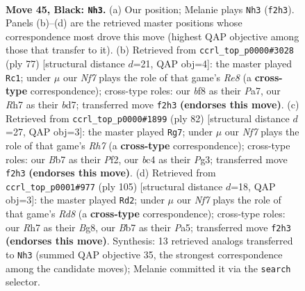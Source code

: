 \documentclass[11pt]{article}
\begin{document}
\clearpage

\begin{figure}[p]\centering
\begin{subfigure}{0.46\textwidth}\centering
\resizebox{\linewidth}{!}{%
\newchessgame
\chessboard[
  setfen={5BR1/pb1p3r/8/5k2/2B5/8/PPK2n2/8 b - - 11 45},
  showmover=false,
  pgfstyle=straightmove, color=movearrow, markmove={f2-h3}
]}
\caption{}
\end{subfigure}\hfill
\begin{subfigure}{0.46\textwidth}\centering
\resizebox{\linewidth}{!}{%
\newchessgame
\chessboard[
  setfen={6k1/p2B1p2/2PB4/3n4/P7/5P2/6K1/4r3 b - - 0 39},
  showmover=false,
  pgfstyle=straightmove, color=movearrow, markmove={e1-c1}
]}
\caption{}
\end{subfigure}
\\[4pt]
\begin{subfigure}{0.46\textwidth}\centering
\resizebox{\linewidth}{!}{%
\newchessgame
\chessboard[
  setfen={8/7R/2k3p1/r1b5/3p4/1K4P1/5P1P/5B2 w - - 1 42},
  showmover=false,
  pgfstyle=straightmove, color=movearrow, markmove={h7-g7}
]}
\caption{}
\end{subfigure}\hfill
\begin{subfigure}{0.46\textwidth}\centering
\resizebox{\linewidth}{!}{%
\newchessgame
\chessboard[
  setfen={4k1b1/2R5/8/p1P2P2/4KB2/7p/2P5/3r4 b - - 1 53},
  showmover=false,
  pgfstyle=straightmove, color=movearrow, markmove={d1-d2}
]}
\caption{}
\end{subfigure}
\caption{\textbf{Move 45, Black: \texttt{Nh3}.} (a) Our position; Melanie plays \texttt{Nh3} (\texttt{f2h3}). Panels (b)--(d) are the retrieved master positions whose correspondence most drove this move (highest QAP objective among those that transfer to it). (b) Retrieved from \texttt{ccrl\_top\_p0000\#3028} (ply 77) [structural distance $d$=21, QAP obj=4]: the master played \texttt{Rc1}; under $\mu$ our \emph{Nf7} plays the role of that game's \emph{Re8} (a \textbf{cross-type} correspondence); cross-type roles: our \emph{b}f8 as their \emph{P}a7, our \emph{R}h7 as their \emph{b}d7; transferred move \texttt{f2h3} \textbf{(endorses this move)}. (c) Retrieved from \texttt{ccrl\_top\_p0000\#1899} (ply 82) [structural distance $d$=27, QAP obj=3]: the master played \texttt{Rg7}; under $\mu$ our \emph{Nf7} plays the role of that game's \emph{Rh7} (a \textbf{cross-type} correspondence); cross-type roles: our \emph{B}b7 as their \emph{P}f2, our \emph{b}c4 as their \emph{P}g3; transferred move \texttt{f2h3} \textbf{(endorses this move)}. (d) Retrieved from \texttt{ccrl\_top\_p0001\#977} (ply 105) [structural distance $d$=18, QAP obj=3]: the master played \texttt{Rd2}; under $\mu$ our \emph{Nf7} plays the role of that game's \emph{Rd8} (a \textbf{cross-type} correspondence); cross-type roles: our \emph{R}h7 as their \emph{B}g8, our \emph{B}b7 as their \emph{P}a5; transferred move \texttt{f2h3} \textbf{(endorses this move)}. Synthesis: 13 retrieved analogs transferred to \texttt{Nh3} (summed QAP objective 35, the strongest correspondence among the candidate moves); Melanie committed it via the \texttt{search} selector.}
\label{fig:thought-m89}
\end{figure}
\end{document}
